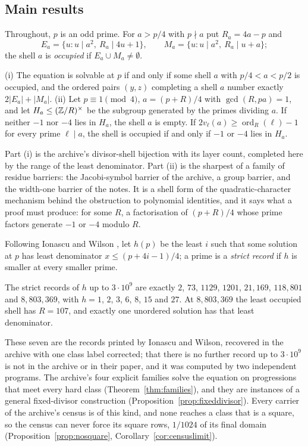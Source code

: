 \subsection*{Main results}

Throughout, $p$ is an odd prime. For $a>p/4$ with $p\nmid a$ put $R_a=4a-p$ and
\[
E_a=\{u: u\mid a^2,\ R_a\mid 4u+1\},\qquad M_a=\{u: u\mid a^2,\ R_a\mid u+a\};
\]
the shell $a$ is \emph{occupied} if $E_a\cup M_a\ne\emptyset$.

\begin{introthm}
(i) The equation is solvable at $p$ if and only if some shell $a$ with $p/4<a<p/2$ is occupied, and the ordered pairs $(y,z)$ completing a shell $a$ number exactly $2|E_a|+|M_a|$.
(ii) Let $p\equiv1\pmod4$, $a=(p+R)/4$ with $\gcd(R,pa)=1$, and let $H_a\le(\mathbb{Z}/R)^\times$ be the subgroup generated by the primes dividing $a$. If neither $-1$ nor $-4$ lies in $H_a$, the shell $a$ is empty. If $2v_\ell(a)\ge\operatorname{ord}_R(\ell)-1$ for every prime $\ell\mid a$, the shell is occupied if and only if $-1$ or $-4$ lies in $H_a$.
\end{introthm}

Part (i) is the archive's divisor-shell bijection with its layer count, completed here by the range of the least denominator. Part (ii) is the sharpest of a family of residue barriers: the Jacobi-symbol barrier of the archive, a group barrier, and the width-one barrier of the notes. It is a shell form of the quadratic-character mechanism behind the obstruction to polynomial identities, and it says what a proof must produce: for some $R$, a factorisation of $(p+R)/4$ whose prime factors generate $-1$ or $-4$ modulo $R$.

Following Ionascu and Wilson \cite{IonascuWilson}, let $h(p)$ be the least $i$ such that some solution at $p$ has least denominator $x\le(p+4i-1)/4$; a prime is a \emph{strict record} if $h$ is smaller at every smaller prime.

\begin{introthm}
The strict records of $h$ up to $3\cdot10^9$ are exactly $2$, $73$, $1129$, $1201$, $21{,}169$, $118{,}801$ and $8{,}803{,}369$, with $h=1$, $2$, $3$, $6$, $8$, $15$ and $27$. At $8{,}803{,}369$ the least occupied shell has $R=107$, and exactly one unordered solution has that least denominator.
\end{introthm}

These seven are the records printed by Ionascu and Wilson, recovered in the archive with one class label corrected; that there is no further record up to $3\cdot10^9$ is not in the archive or in their paper, and it was computed by two independent programs. The archive's four explicit families solve the equation on progressions that meet every hard class (Theorem~\ref{thm:families}), and they are instances of a general fixed-divisor construction (Proposition~\ref{prop:fixeddivisor}). Every carrier of the archive's census is of this kind, and none reaches a class that is a square, so the census can never force its square rows, $1/1024$ of its final domain (Proposition~\ref{prop:nosquare}, Corollary~\ref{cor:censuslimit}).

